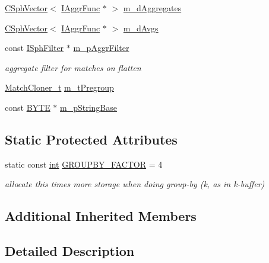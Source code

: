 \begin{DoxyCompactItemize}
\hyperlink{classCSphVector}{C\-Sph\-Vector}$<$ \hyperlink{classIAggrFunc}{I\-Aggr\-Func} $\ast$ $>$ \hyperlink{classCSphKBufferGroupSorter_ad0892c9b2b931104399b2c0136016fa8}{m\-\_\-d\-Aggregates}
\item 
\hyperlink{classCSphVector}{C\-Sph\-Vector}$<$ \hyperlink{classIAggrFunc}{I\-Aggr\-Func} $\ast$ $>$ \hyperlink{classCSphKBufferGroupSorter_a504d233b137a4e6dd84a6ff564927e60}{m\-\_\-d\-Avgs}
\item 
const \hyperlink{structISphFilter}{I\-Sph\-Filter} $\ast$ \hyperlink{classCSphKBufferGroupSorter_a6c3ed879d55381387f0258f439849e1d}{m\-\_\-p\-Aggr\-Filter}
\begin{DoxyCompactList}\small\item\em aggregate filter for matches on flatten \end{DoxyCompactList}\item 
\hyperlink{structMatchCloner__t}{Match\-Cloner\-\_\-t} \hyperlink{classCSphKBufferGroupSorter_a39a11343e6d54262d9f9c6816d8ce9b8}{m\-\_\-t\-Pregroup}
\item 
const \hyperlink{sphinxstd_8h_a4ae1dab0fb4b072a66584546209e7d58}{B\-Y\-T\-E} $\ast$ \hyperlink{classCSphKBufferGroupSorter_a7d56d9cb73e353fb6cf77ea673c871ef}{m\-\_\-p\-String\-Base}
\end{DoxyCompactItemize}
\subsection*{Static Protected Attributes}
\begin{DoxyCompactItemize}
\item 
static const \hyperlink{sphinxexpr_8cpp_a4a26e8f9cb8b736e0c4cbf4d16de985e}{int} \hyperlink{classCSphKBufferGroupSorter_ae3198d6eaaec14729e9d291777422021}{G\-R\-O\-U\-P\-B\-Y\-\_\-\-F\-A\-C\-T\-O\-R} = 4
\begin{DoxyCompactList}\small\item\em allocate this times more storage when doing group-\/by (k, as in k-\/buffer) \end{DoxyCompactList}\end{DoxyCompactItemize}
\subsection*{Additional Inherited Members}


\subsection{Detailed Description}
